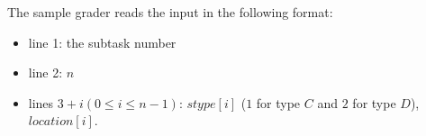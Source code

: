 The sample grader reads the input in the following format:

\begin{itemize}
\item line 1: the subtask number
\item line 2: $n$
\item lines $3 + i (0 \le i \le n - 1)$: $stype[i]$ ($1$ for type $C$ and $2$ for type $D$), $location[i]$.
\end{itemize}